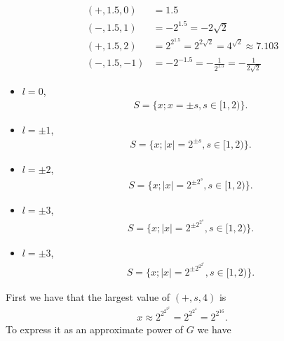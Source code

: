 \begin{questions}

\begin{solution}
\begin{align*}
(+, 1.5, 0)&=1.5\\
(-, 1.5, 1)&=-2^{1.5}=-2\sqrt{2}\\
(+, 1.5, 2)&=2^{2^{1.5}}=2^{2\sqrt{2}}=4^{\sqrt{2}}\approx 7.103\\
(-, 1.5, −1)&=-2^{-1.5}=-\frac{1}{2^{1.5}}=-\frac{1}{2\sqrt{2}}
\end{align*}
\end{solution}
\begin{solution}
\begin{itemize}
\item $l=0$,
\begin{align*}
S=\{x;x=\pm s, s\in [1,2)\}.
\end{align*}
\item $l=\pm 1$,
\begin{align*}
S=\{x;|x|= 2^{\pm s}, s\in [1,2)\}.
\end{align*}
\item $l=\pm 2$,
\begin{align*}
S=\{x;|x|= 2^{\pm 2^s}, s\in [1,2)\}.
\end{align*}
\item $l=\pm 3$,
\begin{align*}
S=\{x;|x|= 2^{\pm 2^{2^s}}, s\in [1,2)\}.
\end{align*}
\item $l=\pm 3$,
\begin{align*}
S=\{x;|x|= 2^{\pm 2^{2^{2^s}}}, s\in [1,2)\}.
\end{align*}
\end{itemize}
\end{solution}
\begin{solution}
First we have that the largest value of $(+,s,4)$ is
\begin{align*}
x\approx 2^{2^{2^{2^2}}}=2^{2^{2^{4}}}=2^{2^{16}}.
\end{align*}
To express it as an approximate power of $G$ we have
\begin{align*}

\end{align*}
\end{solution}
\end{questions}
